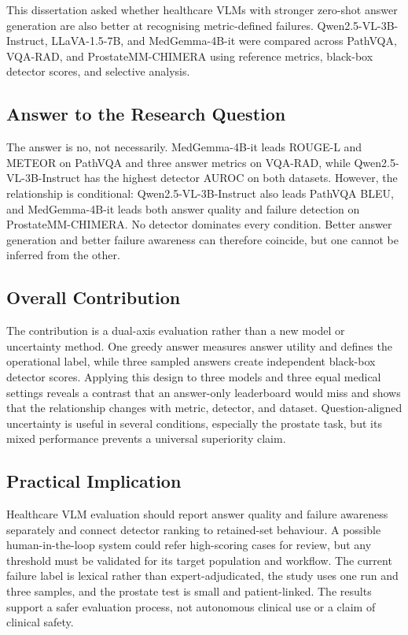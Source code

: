 This dissertation asked whether healthcare VLMs with stronger zero-shot answer generation are also better at recognising metric-defined failures. Qwen2.5-VL-3B-Instruct, LLaVA-1.5-7B, and MedGemma-4B-it were compared across PathVQA, VQA-RAD, and ProstateMM-CHIMERA using reference metrics, black-box detector scores, and selective analysis.

\subsection{Answer to the Research Question}

The answer is no, not necessarily. MedGemma-4B-it leads ROUGE-L and METEOR on PathVQA and three answer metrics on VQA-RAD, while Qwen2.5-VL-3B-Instruct has the highest detector AUROC on both datasets. However, the relationship is conditional: Qwen2.5-VL-3B-Instruct also leads PathVQA BLEU, and MedGemma-4B-it leads both answer quality and failure detection on ProstateMM-CHIMERA. No detector dominates every condition. Better answer generation and better failure awareness can therefore coincide, but one cannot be inferred from the other.

\subsection{Overall Contribution}

The contribution is a dual-axis evaluation rather than a new model or uncertainty method. One greedy answer measures answer utility and defines the operational label, while three sampled answers create independent black-box detector scores. Applying this design to three models and three equal medical settings reveals a contrast that an answer-only leaderboard would miss and shows that the relationship changes with metric, detector, and dataset. Question-aligned uncertainty is useful in several conditions, especially the prostate task, but its mixed performance prevents a universal superiority claim.

\subsection{Practical Implication}

Healthcare VLM evaluation should report answer quality and failure awareness separately and connect detector ranking to retained-set behaviour. A possible human-in-the-loop system could refer high-scoring cases for review, but any threshold must be validated for its target population and workflow. The current failure label is lexical rather than expert-adjudicated, the study uses one run and three samples, and the prostate test is small and patient-linked. The results support a safer evaluation process, not autonomous clinical use or a claim of clinical safety.

